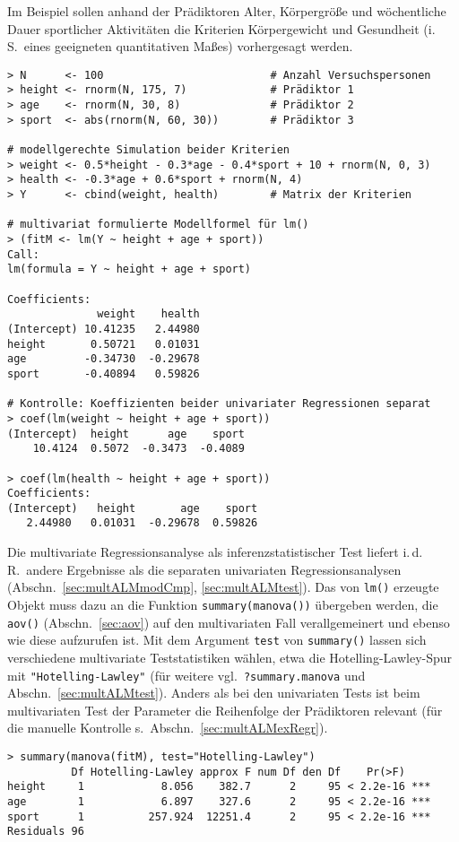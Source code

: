Im Beispiel sollen anhand der Prädiktoren Alter, Körpergröße und wöchentliche Dauer sportlicher Aktivitäten die Kriterien Körpergewicht und Gesundheit (i.\,S.\ eines geeigneten quantitativen Maßes) vorhergesagt werden.
\begin{lstlisting}
> N      <- 100                          # Anzahl Versuchspersonen
> height <- rnorm(N, 175, 7)             # Prädiktor 1
> age    <- rnorm(N, 30, 8)              # Prädiktor 2
> sport  <- abs(rnorm(N, 60, 30))        # Prädiktor 3

# modellgerechte Simulation beider Kriterien
> weight <- 0.5*height - 0.3*age - 0.4*sport + 10 + rnorm(N, 0, 3)
> health <- -0.3*age + 0.6*sport + rnorm(N, 4)
> Y      <- cbind(weight, health)        # Matrix der Kriterien

# multivariat formulierte Modellformel für lm()
> (fitM <- lm(Y ~ height + age + sport))
Call:
lm(formula = Y ~ height + age + sport)

Coefficients:
              weight    health
(Intercept) 10.41235   2.44980
height       0.50721   0.01031
age         -0.34730  -0.29678
sport       -0.40894   0.59826

# Kontrolle: Koeffizienten beider univariater Regressionen separat
> coef(lm(weight ~ height + age + sport))
(Intercept)  height      age    sport
    10.4124  0.5072  -0.3473  -0.4089

> coef(lm(health ~ height + age + sport))
Coefficients:
(Intercept)   height       age    sport
   2.44980   0.01031  -0.29678  0.59826
\end{lstlisting}

Die multivariate Regressionsanalyse als inferenzstatistischer Test liefert i.\,d.\,R.\ andere Ergebnisse als die separaten univariaten Regressionsanalysen (Abschn.\ \ref{sec:multALMmodCmp}, \ref{sec:multALMtest}). Das von \lstinline!lm()! erzeugte Objekt muss dazu an die Funktion \lstinline!summary(manova())! übergeben werden, die \lstinline!aov()! (Abschn.\ \ref{sec:aov}) auf den multivariaten Fall verallgemeinert und ebenso wie diese aufzurufen ist. Mit dem Argument \lstinline!test! von \lstinline!summary()! lassen sich verschiedene multivariate Teststatistiken wählen, etwa die Hotelling-Lawley-Spur mit \lstinline!"Hotelling-Lawley"! (für weitere vgl.\ \lstinline!?summary.manova! und Abschn.\ \ref{sec:multALMtest}). Anders als bei den univariaten Tests ist beim multivariaten Test der Parameter die Reihenfolge der Prädiktoren relevant (für die manuelle Kontrolle s.\ Abschn.\ \ref{sec:multALMexRegr}).
\begin{lstlisting}
> summary(manova(fitM), test="Hotelling-Lawley")
          Df Hotelling-Lawley approx F num Df den Df    Pr(>F)
height     1            8.056    382.7      2     95 < 2.2e-16 ***
age        1            6.897    327.6      2     95 < 2.2e-16 ***
sport      1          257.924  12251.4      2     95 < 2.2e-16 ***
Residuals 96
\end{lstlisting}

